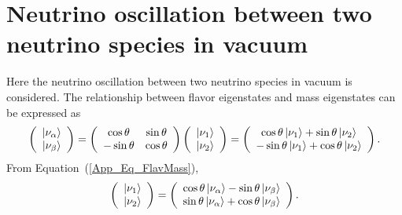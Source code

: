 
%
%

\section{Neutrino oscillation between two neutrino species in vacuum}\label{AppA}
\vs\hs Here the neutrino oscillation between two neutrino species in vacuum is considered.
The relationship between flavor eigenstates and mass eigenstates can be expressed as
\begin{eqnarray}\label{App_Eq_FlavMass}
	\left(
	\begin{array}{c}
		\ket{\nu_{\alpha}}\\
		\ket{\nu_{\beta}}
	\end{array}
	\right)
	=\left(
	\begin{array}{cc}
		\cos\theta&\sin\theta\\
		-\sin\theta&\cos\theta
	\end{array}
	\right)
	\left(
	\begin{array}{c}
		\ket{\nu_{1}}\\
		\ket{\nu_{2}}
	\end{array}
	\right)
	=\left(
	\begin{array}{c}
		\cos\theta\ket{\nu_{1}}+\sin\theta\ket{\nu_{2}}\\
		-\sin\theta\ket{\nu_{1}}+\cos\theta\ket{\nu_{2}}
	\end{array}
	\right).
\end{eqnarray}
From Equation~(\ref{App_Eq_FlavMass}),
\begin{eqnarray}
	\left(
	\begin{array}{c}
		\ket{\nu_{1}}\\
		\ket{\nu_{2}}
	\end{array}
	\right)
	=\left(
	\begin{array}{c}
		\cos\theta\ket{\nu_{\alpha}}-\sin\theta\ket{\nu_{\beta}}\\
		\sin\theta\ket{\nu_{\alpha}}+\cos\theta\ket{\nu_{\beta}}
	\end{array}
	\right).
\end{eqnarray}


\newpage
